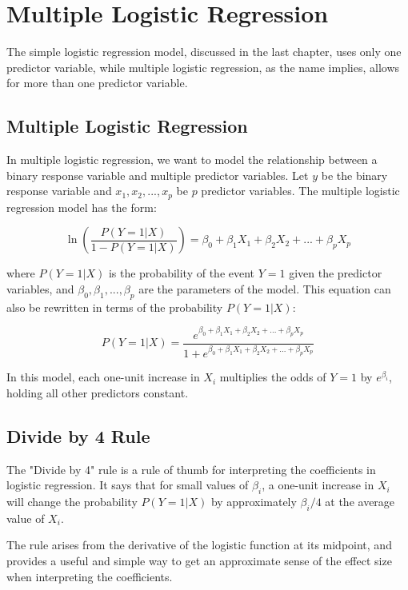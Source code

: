 \chapter{Multiple Logistic Regression}

The simple logistic regression model, discussed in the last chapter,
uses only one predictor variable, while multiple logistic regression,
as the name implies, allows for more than one predictor variable.

\section{Multiple Logistic Regression}

In multiple logistic regression, we want to model the relationship
between a binary response variable and multiple predictor
variables. Let $y$ be the binary response variable and $x_1, x_2, ...,
x_p$ be $p$ predictor variables. The multiple logistic regression
model has the form:

\begin{equation*}
\ln \left( \frac{P(Y=1|X)}{1-P(Y=1|X)} \right) = \beta_0 + \beta_1X_1 + \beta_2X_2 + ... + \beta_pX_p
\end{equation*}

where $P(Y=1|X)$ is the probability of the event $Y=1$ given the
predictor variables, and $\beta_0, \beta_1, ..., \beta_p$ are the
parameters of the model. This equation can also be rewritten in terms
of the probability $P(Y=1|X)$:

\begin{equation*}
P(Y=1|X) = \frac{e^{\beta_0 + \beta_1X_1 + \beta_2X_2 + ... + \beta_pX_p}}{1 + e^{\beta_0 + \beta_1X_1 + \beta_2X_2 + ... + \beta_pX_p}}
\end{equation*}

In this model, each one-unit increase in $X_i$ multiplies the odds of
$Y=1$ by $e^{\beta_i}$, holding all other predictors constant.

\section{Divide by 4 Rule}

The "Divide by 4" rule is a rule of thumb for interpreting the
coefficients in logistic regression. It says that for small values of
$\beta_i$, a one-unit increase in $X_i$ will change the probability
$P(Y=1|X)$ by approximately $\beta_i / 4$ at the average value of
$X_i$.

The rule arises from the derivative of the logistic function at its
midpoint, and provides a useful and simple way to get an approximate
sense of the effect size when interpreting the coefficients.
